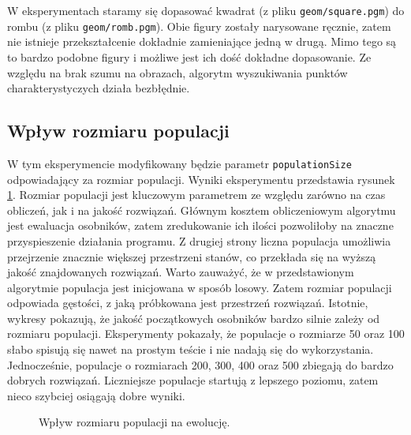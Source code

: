 \documentclass[a4paper,12pt,leqno]{article}
\begin{document}
W eksperymentach staramy się dopasować kwadrat (z pliku \texttt{geom/square.pgm}) do rombu (z pliku \texttt{geom/romb.pgm}). Obie figury zostały
narysowane ręcznie, zatem nie istnieje przekształcenie dokładnie zamieniające jedną w drugą. Mimo tego są to bardzo podobne figury i możliwe jest
ich dość dokładne dopasowanie. Ze względu na brak szumu na obrazach, algorytm wyszukiwania punktów charakterystyczych działa bezbłędnie.

\subsection{Wpływ rozmiaru populacji}
W tym eksperymencie modyfikowany będzie parametr \texttt{populationSize} odpowiadający za rozmiar populacji. Wyniki eksperymentu przedstawia
rysunek \ref{popsize}. Rozmiar populacji jest kluczowym parametrem ze względu zarówno na czas obliczeń, jak i na jakość rozwiązań. Głównym kosztem
obliczeniowym algorytmu jest ewaluacja osobników, zatem zredukowanie ich ilości pozwoliłoby na znaczne przyspieszenie działania programu. Z drugiej
strony liczna populacja umożliwia przejrzenie znacznie większej przestrzeni stanów, co przekłada się na wyższą jakość znajdowanych rozwiązań.
Warto zauważyć, że w przedstawionym algorytmie populacja jest inicjowana w sposób losowy. Zatem rozmiar populacji odpowiada gęstości, z jaką 
próbkowana jest przestrzeń rozwiązań. Istotnie, wykresy pokazują, że jakość początkowych osobników bardzo silnie zależy od rozmiaru populacji.
Eksperymenty pokazały, że populacje o rozmiarze 50 oraz 100 słabo spisują się nawet na prostym teście i nie nadają się do wykorzystania.
Jednocześnie, populacje o rozmiarach 200, 300, 400 oraz 500 zbiegają do bardzo dobrych rozwiązań. Liczniejsze populacje startują z lepszego
poziomu, zatem nieco szybciej osiągają dobre wyniki.

\begin{figure}\centering
\footnotesize\vspace{-2em}
\normalsize\caption{Wpływ rozmiaru populacji na ewolucję.}\label{popsize}
\end{figure}
\end{document}
